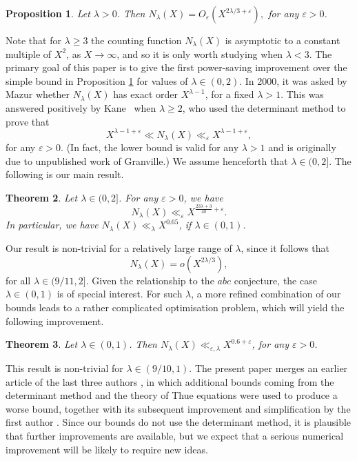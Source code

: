 \documentclass[a4paper,11pt,twoside,reqno]{amsart}
\renewcommand{\geq}{\geqslant}
\renewcommand{\ge}{\geqslant}
\newcommand\ve{\varepsilon}
\theoremstyle{plain}
\newtheorem{prop}{Proposition}
\newtheorem{theorem}[prop]{Theorem}
\theoremstyle{remark}
\numberwithin{prop}{section}
\numberwithin{equation}{section}
\begin{document}
\begin{prop}\label{prop:trivial}
Let $\lambda>0$. Then 
$
N_\lambda(X)=O_\ve( X^{2\lambda/3+\ve}),
$
for any $\ve>0$.
\end{prop}

Note that for $\lambda\geq 3$ the counting function $N_\lambda(X)$ is asymptotic to a constant multiple of $X^2$, as $X\to \infty$,  and so it is only worth  studying when  $\lambda <3$. 
The primary goal of this paper is to give the first power-saving improvement over the simple bound
in Proposition \ref{prop:trivial}
 for values of $\lambda\in (0,2)$. In 2000, it was asked by Mazur \cite{mazur} whether 
$N_\lambda(X)$ has exact order $X^{\lambda-1}$, for a  fixed $\lambda > 1$. 
This was answered positively by Kane~\cite{kane} when 
  $\lambda \ge 2$,  who used  the determinant method  to prove that 
$$
X^{\lambda-1+\varepsilon}\ll 
N_{\lambda}(X) \ll_{\varepsilon} X^{\lambda-1+\varepsilon},
$$
for any $\ve>0$.
(In fact, the lower bound is valid for any $\lambda> 1$ and is originally due to unpublished work of Granville.) We assume henceforth that $\lambda\in (0,2]$. The following is our main result.  

\begin{theorem} \label{thm:main_general}
Let  $\lambda \in (0,2]$. For any $\ve>0$, we have
    \[N_{\lambda}(X) \ll_{\varepsilon} X^{\frac{23\lambda+3}{40}+\varepsilon}.\]
    In particular, we have 
    $
    N_\lambda(X) \ll_{\lambda} X^{0.65}
    $,
if $\lambda\in (0,1)$.
\end{theorem}

Our result is non-trivial for a relatively large range of $\lambda$, since it follows that 
$$
N_{\lambda}(X)=o(X^{2\lambda/3}),
$$
for all $\lambda \in (9/11,2]$. Given the relationship to the $abc$ conjecture, the case $\lambda\in (0,1)$ is of special interest. For such $\lambda$, 
a more refined combination of our bounds leads to a rather complicated optimisation problem, which will yield the following improvement. 

\begin{theorem} \label{thm:main_optimal}
Let $\lambda \in (0,1)$. Then $N_\lambda(X) \ll_{\ve,\lambda} X^{0.6+\ve}$, for any $\ve>0$.
\end{theorem}

This result is non-trivial for $\lambda\in (9/10,1)$.
The present paper merges an earlier article 
of the last three authors \cite{blt24}, in which additional bounds coming from 
the determinant method and the theory of Thue equations were used to produce a worse bound, together with  its subsequent improvement and simplification by the first author 
 \cite{bernert25}.
Since our bounds do not use the determinant method, it is plausible that further improvements are available, but we expect that a serious numerical improvement will be likely to require new ideas.
\end{document}
